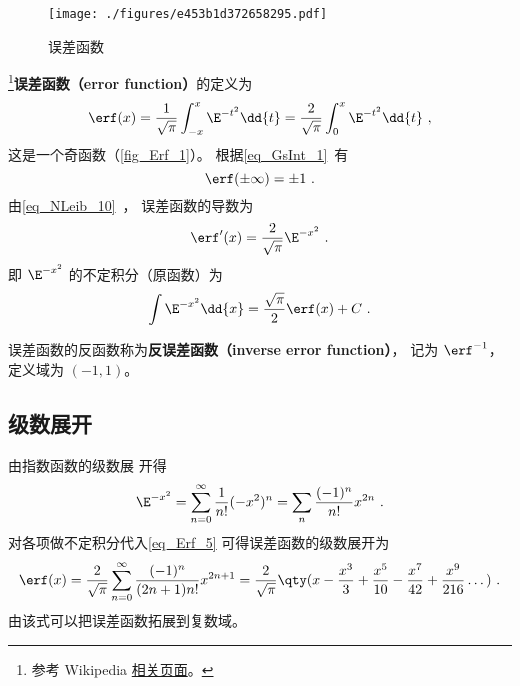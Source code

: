 

\begin{figure}[ht]
\centering
\texttt{[image: ./figures/e453b1d372658295.pdf]}
\caption{误差函数} \label{fig_Erf_1}
\end{figure}

\footnote{参考 Wikipedia \href{https://en.wikipedia.org/wiki/Error_function}{相关页面}。}\textbf{误差函数（error function）}的定义为
\begin{equation}\label{eq_Erf_1}
\erf(x) = \frac{1}{\sqrt{\pi}} \int_{-x}^x \E^{-t^2} \dd{t}
= \frac{2}{\sqrt{\pi}} \int_{0}^x \E^{-t^2} \dd{t}~,
\end{equation}
这是一个奇函数（\autoref{fig_Erf_1}）。 根据\autoref{eq_GsInt_1}~有
\begin{equation}
\erf(\pm\infty) = \pm 1~.
\end{equation}
由\autoref{eq_NLeib_10}~， 误差函数的导数为
\begin{equation} %
\erf'(x) = \frac{2}{\sqrt{\pi}} \E^{-x^2}~.
\end{equation}
即 $\E^{-x^2}$ 的不定积分（原函数）为
\begin{equation}\label{eq_Erf_5}
\int \E^{-x^2} \dd{x} = \frac{\sqrt{\pi}}{2} \erf(x) + C~.
\end{equation}

误差函数的反函数称为\textbf{反误差函数（inverse error function）}， 记为 $\erf^{-1}$， 定义域为 $(-1,1)$。

\subsection{级数展开}
由指数函数的级数展%
开得
\begin{equation}
\E^{-x^2} = \sum_{n=0}^\infty \frac{1}{n!} (-x^2)^n = \sum_n \frac{(-1)^n}{n!} x^{2n}~.
\end{equation}
对各项做不定积分代入\autoref{eq_Erf_5} 可得误差函数的级数展开为
\begin{equation}
\erf(x) = \frac{2}{\sqrt{\pi}} \sum_{n=0}^\infty \frac{(-1)^n}{(2n+1)n!} x^{2n+1}
= \frac{2}{\sqrt{\pi}}\qty(x - \frac{x^3}{3} + \frac{x^5}{10} - \frac{x^7}{42} + \frac{x^9}{216} \dots)~.
\end{equation}
由该式可以把误差函数拓展到复数域。

